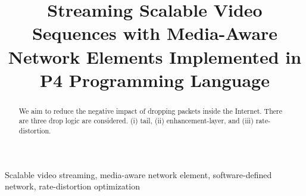\documentclass[10pt, conference]{IEEEtran}
\begin{document}
\sloppy

\title{
Streaming Scalable Video Sequences with Media-Aware Network Elements Implemented in P4 Programming Language
}

\author{ 
\vspace{2pt}
}
\maketitle

\begin{abstract}
  We aim to reduce the negative impact of dropping packets inside the Internet. There are three drop logic are considered. (i) tail, (ii) enhancement-layer, and (iii) rate-distortion.
\end{abstract}
\begin{IEEEkeywords}
Scalable video streaming, media-aware network element, software-defined network, rate-distortion optimization
\end{IEEEkeywords}










\end{document}
